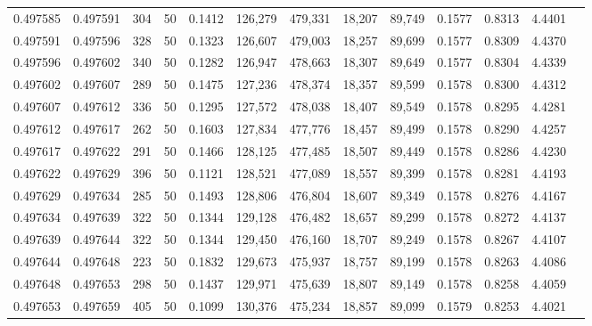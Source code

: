 \begin{tabular}{rrrrrrrrrrrrr}
0.497585 & 0.497591 & 304 &  50 &                                     0.1412 & 126,279 & 479,331 &  18,207 &  89,749 & 0.1577 & 0.8313 & 4.4401 \\
0.497591 & 0.497596 & 328 &  50 &                                     0.1323 & 126,607 & 479,003 &  18,257 &  89,699 & 0.1577 & 0.8309 & 4.4370 \\
0.497596 & 0.497602 & 340 &  50 &                                     0.1282 & 126,947 & 478,663 &  18,307 &  89,649 & 0.1577 & 0.8304 & 4.4339 \\
0.497602 & 0.497607 & 289 &  50 &                                     0.1475 & 127,236 & 478,374 &  18,357 &  89,599 & 0.1578 & 0.8300 & 4.4312 \\
0.497607 & 0.497612 & 336 &  50 &                                     0.1295 & 127,572 & 478,038 &  18,407 &  89,549 & 0.1578 & 0.8295 & 4.4281 \\
0.497612 & 0.497617 & 262 &  50 &                                     0.1603 & 127,834 & 477,776 &  18,457 &  89,499 & 0.1578 & 0.8290 & 4.4257 \\
0.497617 & 0.497622 & 291 &  50 &                                     0.1466 & 128,125 & 477,485 &  18,507 &  89,449 & 0.1578 & 0.8286 & 4.4230 \\
0.497622 & 0.497629 & 396 &  50 &                                     0.1121 & 128,521 & 477,089 &  18,557 &  89,399 & 0.1578 & 0.8281 & 4.4193 \\
0.497629 & 0.497634 & 285 &  50 &                                     0.1493 & 128,806 & 476,804 &  18,607 &  89,349 & 0.1578 & 0.8276 & 4.4167 \\
0.497634 & 0.497639 & 322 &  50 &                                     0.1344 & 129,128 & 476,482 &  18,657 &  89,299 & 0.1578 & 0.8272 & 4.4137 \\
0.497639 & 0.497644 & 322 &  50 &                                     0.1344 & 129,450 & 476,160 &  18,707 &  89,249 & 0.1578 & 0.8267 & 4.4107 \\
0.497644 & 0.497648 & 223 &  50 &                                     0.1832 & 129,673 & 475,937 &  18,757 &  89,199 & 0.1578 & 0.8263 & 4.4086 \\
0.497648 & 0.497653 & 298 &  50 &                                     0.1437 & 129,971 & 475,639 &  18,807 &  89,149 & 0.1578 & 0.8258 & 4.4059 \\
0.497653 & 0.497659 & 405 &  50 &                                     0.1099 & 130,376 & 475,234 &  18,857 &  89,099 & 0.1579 & 0.8253 & 4.4021 \\

\end{tabular}
